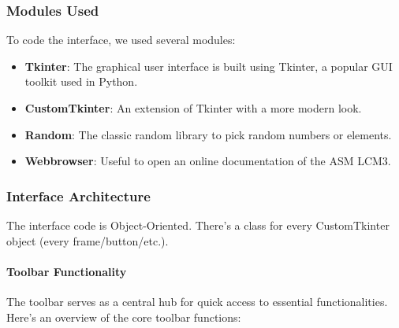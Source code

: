\documentclass{article}
\begin{document}
\subsubsection{Modules Used}
To code the interface, we used several modules:

\begin{itemize}
    \item \textbf{Tkinter}: The graphical user interface is built using Tkinter, a popular GUI toolkit used in Python.
    \item \textbf{CustomTkinter}: An extension of Tkinter with a more modern look.
    \item \textbf{Random}: The classic random library to pick random numbers or elements.
    \item \textbf{Webbrowser}: Useful to open an online documentation of the ASM LCM3.
    
\end{itemize}


\subsubsection{Interface Architecture}

The interface code is Object-Oriented. There's a class for every CustomTkinter object (every frame/button/etc.).

\paragraph{Toolbar Functionality}
The toolbar serves as a central hub for quick access to essential functionalities. Here's an overview of the core toolbar functions:
\end{document}
